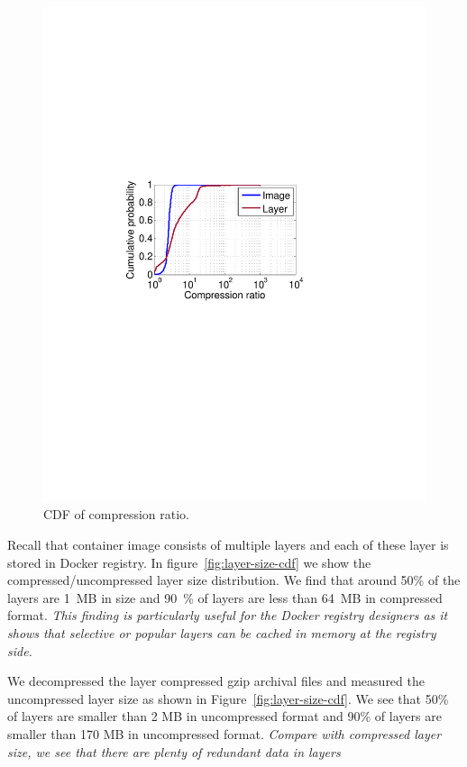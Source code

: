 \begin{figure}[t]
\begin{minipage}{0.22\textwidth}
		\includegraphics[width=1\textwidth]{graphs/compress-ratio-cdf.pdf}
		\caption{CDF of compression ratio.}
		\label{fig:compress-ratio}
	\end{minipage}
\end{figure}

Recall that container image consists of multiple layers and each of these layer
is stored in Docker registry. In figure~\ref{fig:layer-size-cdf} we show the compressed/uncompressed layer
size distribution. We find that around 50\% of the layers are 1~MB in size and
90~\% of layers are less than 64~MB in compressed format. \emph{This finding is particularly useful for
	the Docker registry designers as it shows that selective or popular layers can
	be cached in memory at the registry side.}


%
%
We decompressed the layer compressed gzip archival files and measured the uncompressed layer size as shown in Figure~\ref{fig:layer-size-cdf}. We see that
50\% of layers are smaller than 2 MB in uncompressed format and 90\% of layers are smaller than 170 MB in uncompressed format. 
\textit{Compare with compressed layer size, we see that there are plenty of redundant data in layers}

